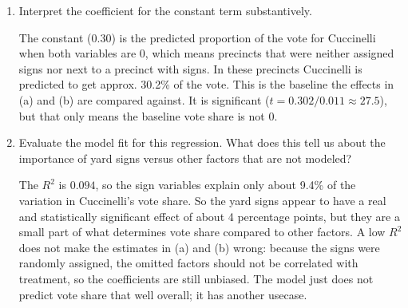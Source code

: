 \documentclass[12pt,letterpaper]{article}
\begin{document}
\begin{enumerate}
	\vspace{1cm}

	\textbf{Code}
	
	\vspace{.5cm}
	\textbf{Output}
	\begin{verbatim}
t = 3.231 | p = 0.0016 | critical t = 1.979
	\end{verbatim}

	\vspace{7cm}
	\item [(c)] Interpret the coefficient for the constant term substantively.
	\vspace{.5cm}

	The constant ($0.30$) is the predicted proportion of the vote for Cuccinelli when both variables are 0, which means precincts that were neither assigned signs nor next to a precinct with signs. In these precincts Cuccinelli is predicted to get approx. 30.2\% of the vote. This is the baseline the effects in (a) and (b) are compared against. It is significant ($t = 0.302/0.011 \approx 27.5$), but that only means the baseline vote share is not 0.
	\vspace{2cm}
	
	\item [(d)] Evaluate the model fit for this regression.  What does this	tell us about the importance of yard signs versus other factors that are not modeled?
	\vspace{.5cm}

	The $R^2$ is $0.094$, so the sign variables explain only about 9.4\% of the variation in Cuccinelli's vote share. So the yard signs appear to have a real and statistically significant effect of about 4 percentage points, but they are a small part of what determines vote share compared to other factors. A low $R^2$ does not make the estimates in (a) and (b) wrong: because the signs were randomly assigned, the omitted factors should not be correlated with treatment, so the coefficients are still unbiased. The model just does not predict vote share that well overall; it has another usecase.

\end{enumerate}  
\end{document}
